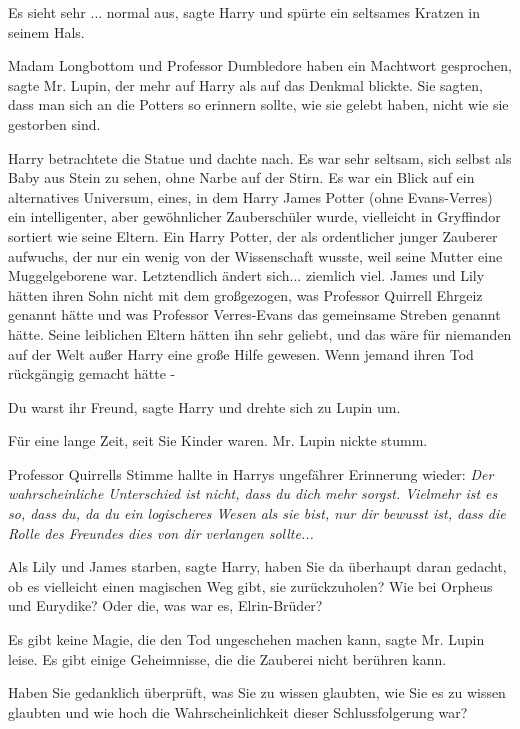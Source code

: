 \glqq Es sieht sehr ... normal aus\grqq{}, sagte Harry und spürte ein seltsames
Kratzen in seinem Hals.

\glqq Madam Longbottom und Professor Dumbledore haben ein Machtwort
gesprochen\grqq{}, sagte Mr. Lupin, der mehr auf Harry als auf das Denkmal
blickte. \glqq Sie sagten, dass man sich an die Potters so erinnern sollte, wie
sie gelebt haben, nicht wie sie gestorben sind.\grqq{}

Harry betrachtete die Statue und dachte nach. Es war sehr seltsam, sich selbst
als Baby aus Stein zu sehen, ohne Narbe auf der Stirn. Es war ein Blick auf ein
alternatives Universum, eines, in dem Harry James Potter (ohne Evans-Verres) ein
intelligenter, aber gewöhnlicher Zauberschüler wurde, vielleicht in Gryffindor
sortiert wie seine Eltern. Ein Harry Potter, der als ordentlicher junger
Zauberer aufwuchs, der nur ein wenig von der Wissenschaft wusste, weil seine
Mutter eine Muggelgeborene war. Letztendlich ändert sich... ziemlich viel. James
und Lily hätten ihren Sohn nicht mit dem großgezogen, was Professor Quirrell
Ehrgeiz genannt hätte und was Professor Verres-Evans das gemeinsame Streben
genannt hätte. Seine leiblichen Eltern hätten ihn sehr geliebt, und das wäre für
niemanden auf der Welt außer Harry eine große Hilfe gewesen. Wenn jemand ihren
Tod rückgängig gemacht hätte -

\glqq Du warst ihr Freund\grqq{}, sagte Harry und drehte sich zu Lupin um.

\glqq Für eine lange Zeit, seit Sie Kinder waren.\grqq{} Mr. Lupin nickte stumm.

Professor Quirrells Stimme hallte in Harrys ungefährer Erinnerung wieder:
\emph{Der wahrscheinliche Unterschied ist nicht, dass du dich mehr sorgst.
Vielmehr ist es so, dass du, da du ein logischeres Wesen als sie bist, nur dir
bewusst ist, dass die Rolle des Freundes dies von dir verlangen sollte... }

\glqq Als Lily und James starben\grqq{}, sagte Harry, \glqq haben Sie da
überhaupt daran gedacht, ob es vielleicht einen magischen Weg gibt, sie
zurückzuholen? Wie bei Orpheus und Eurydike? Oder die, was war es,
Elrin-Brüder?\grqq{}

\glqq Es gibt keine Magie, die den Tod ungeschehen machen kann\grqq{}, sagte Mr.
Lupin leise. \glqq Es gibt einige Geheimnisse, die die Zauberei nicht berühren
kann.\grqq{}

\glqq Haben Sie gedanklich überprüft, was Sie zu wissen glaubten, wie Sie es zu
wissen glaubten und wie hoch die Wahrscheinlichkeit dieser Schlussfolgerung
war?\grqq{}

